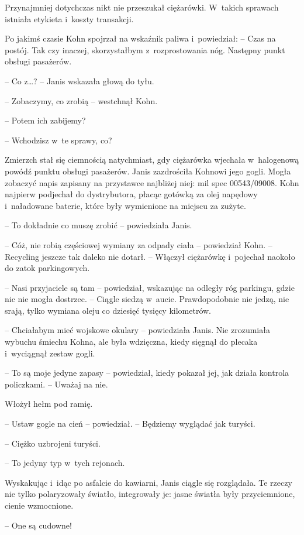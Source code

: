 \documentclass[oneside,polish,11pt,sfheadings]{mwbk}
\begin{document}
Przynajmniej dotychczas nikt nie przeszukał ciężarówki. W~takich
sprawach istniała etykieta i~koszty transakcji.

Po jakimś czasie Kohn spojrzał na wskaźnik paliwa i~powiedział: -- Czas
na postój. Tak czy inaczej, skorzystałbym z~rozprostowania nóg. Następny
punkt obsługi pasażerów.

-- Co z\ldots? -- Janis wskazała głową do tyłu.

-- Zobaczymy, co zrobią -- westchnął Kohn.

-- Potem ich zabijemy?

-- Wchodzisz w~te sprawy, co?

Zmierzch stał się ciemnością natychmiast, gdy ciężarówka wjechała w~halogenową powódź punktu obsługi pasażerów. Janis zazdrościła Kohnowi
jego gogli. Mogła zobaczyć napis zapisany na przystawce najbliżej niej:
mil spec 00543/09008. Kohn najpierw podjechał do dystrybutora, płacąc
gotówką za olej napędowy i~naładowane baterie, które były wymienione na
miejscu za zużyte.

-- To dokładnie co muszę zrobić -- powiedziała Janis.

-- Cóż, nie robią częściowej wymiany za odpady ciała -- powiedział Kohn. -- Recycling jeszcze tak daleko nie dotarł. -- Włączył ciężarówkę i~pojechał
naokoło do zatok parkingowych.

-- Nasi przyjaciele są tam -- powiedział, wskazując na odległy róg
parkingu, gdzie nic nie mogła dostrzec. -- Ciągle siedzą w~aucie.
Prawdopodobnie nie jedzą, nie srają, tylko wymiana oleju co dziesięć
tysięcy kilometrów.

-- Chciałabym mieć wojskowe okulary -- powiedziała Janis. Nie zrozumiała
wybuchu śmiechu Kohna, ale była wdzięczna, kiedy sięgnął do plecaka i~wyciągnął zestaw gogli.

-- To są moje jedyne zapasy -- powiedział, kiedy pokazał jej, jak działa
kontrola policzkami. -- Uważaj na nie.

Włożył hełm pod ramię.

-- Ustaw gogle na cień -- powiedział. -- Będziemy wyglądać jak turyści.

-- Ciężko uzbrojeni turyści.

-- To jedyny typ w~tych rejonach.

Wyskakując i~idąc po asfalcie do kawiarni, Janis ciągle się rozglądała.
Te rzeczy nie tylko polaryzowały światło, integrowały je: jasne światła
były przyciemnione, cienie wzmocnione.

-- One są cudowne!
\end{document}
